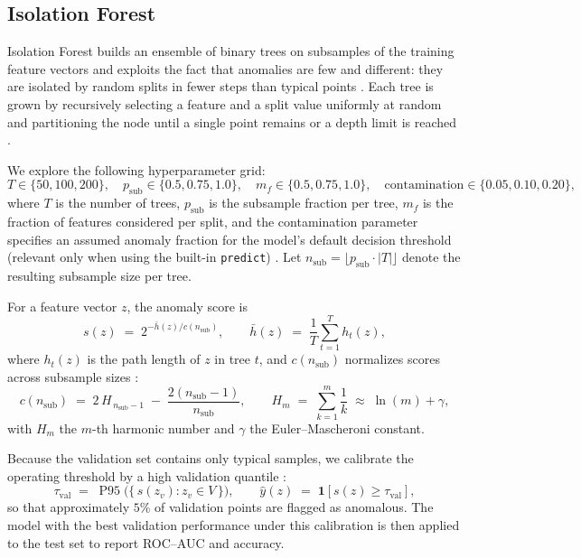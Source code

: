 \documentclass[11pt]{article}
\begin{document}
\subsection{Isolation Forest}

Isolation Forest builds an ensemble of binary trees on subsamples of the training feature vectors and exploits the fact that anomalies are few and different: they are isolated by random splits in fewer steps than typical points \citep{Liu2008,Liu2012}. Each tree is grown by recursively selecting a feature and a split value uniformly at random and partitioning the node until a single point remains or a depth limit is reached \citep{Liu2008}.

\noindent We explore the following hyperparameter grid:
\[
T \in \{50,100,200\},\quad
p_{\text{sub}} \in \{0.5,0.75,1.0\},\quad
m_f \in \{0.5,0.75,1.0\},\quad
\text{contamination} \in \{0.05,0.10,0.20\},
\]
where \(T\) is the number of trees, \(p_{\text{sub}}\) is the subsample fraction per tree, \(m_f\) is the fraction of features considered per split, and the contamination parameter specifies an assumed anomaly fraction for the model’s default decision threshold (relevant only when using the built-in \texttt{predict}) \citep{Liu2012}. Let \(n_{\text{sub}}=\lfloor p_{\text{sub}}\cdot |T| \rfloor\) denote the resulting subsample size per tree.

\noindent For a feature vector \(z\), the anomaly score is
\[
s(z) \;=\; 2^{-\bar{h}(z)/c(n_{\text{sub}})}, 
\qquad
\bar{h}(z) \;=\; \frac{1}{T}\sum_{t=1}^{T} h_t(z),
\]
where \(h_t(z)\) is the path length of \(z\) in tree \(t\), and \(c(n_{\text{sub}})\) normalizes scores across subsample sizes \citep{Liu2008}:
\[
c(n_{\text{sub}}) \;=\; 2\,H_{\,n_{\text{sub}}-1} \;-\; \frac{2(n_{\text{sub}}-1)}{n_{\text{sub}}},
\qquad
H_m \;=\; \sum_{k=1}^{m}\frac{1}{k} \;\approx\; \ln(m)+\gamma,
\]
with \(H_m\) the \(m\)-th harmonic number and \(\gamma\) the Euler–Mascheroni constant.

\noindent Because the validation set contains only typical samples, we calibrate the operating threshold by a high validation quantile \citep{Chandola2009,Campos2016,Ruff2021}:
\[
\tau_{\text{val}} \;=\; \operatorname{P95}\!\big(\{\, s(z_v) : z_v \in V \,\}\big),
\qquad
\hat{y}(z) \;=\; \mathbf{1}\!\left[s(z)\ge \tau_{\text{val}}\right],
\]
so that approximately \(5\%\) of validation points are flagged as anomalous. The model with the best validation performance under this calibration is then applied to the test set to report ROC–AUC and accuracy.
\end{document}

